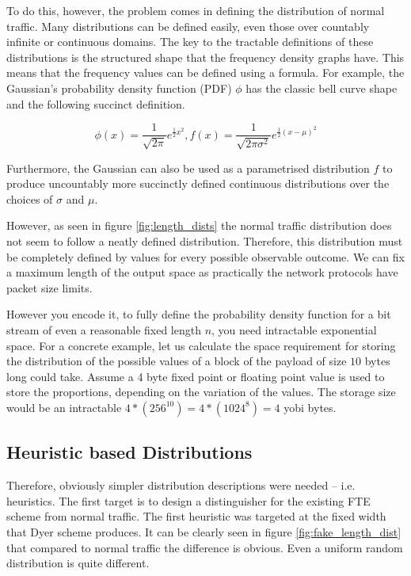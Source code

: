 \documentclass[ %
                    author={Samuel Russell},
                supervisor={Prof. Bogdan Warinschi},
                    degree={MEng},
                     title={Innocuous Ciphertexts},
                  subtitle={The DE-CENSOR Scheme},
                      type={research},
                      year={2018} ]{dissertation}
\begin{document}
To do this, however, the problem comes in defining the distribution of normal traffic.
Many distributions can be defined easily, even those over countably infinite or continuous domains.
The key to the tractable definitions of these distributions is the structured shape that the frequency density graphs have.
This means that the frequency values can be defined using a formula.
For example, the Gaussian's probability density function (PDF) $\phi$ has the classic bell curve shape and the following succinct definition.

$$\phi (x) = \frac{1}{\sqrt{2\pi}}e^{\frac{1}{2}x^2}, f(x) = \frac{1}{\sqrt{2\pi\sigma^2}}e^{\frac{1}{2}(x-\mu)^2}$$

Furthermore, the Gaussian can also be used as a parametrised distribution $f$ to produce uncountably more succinctly defined continuous distributions over the choices of $\sigma$ and $\mu$.

However, as seen in figure \ref{fig:length_dists} the normal traffic distribution does not seem to follow a neatly defined distribution.
Therefore, this distribution must be completely defined by values for every possible observable outcome.
We can fix a maximum length of the output space as practically the network protocols have packet size limits.

However you encode it, to fully define the probability density function for a bit stream of even a reasonable fixed length $n$, you need intractable exponential space.
For a concrete example, let us calculate the space requirement for storing the distribution of the possible values of a block of the payload of size $10$ bytes long could take.
Assume a 4 byte fixed point or floating point value is used to store the proportions, depending on the variation of the values.
The storage size would be an intractable $4*(256^10) = 4*(1024^8) = 4$ yobi bytes.

\subsection{Heuristic based Distributions}

Therefore, obviously simpler distribution descriptions were needed -- i.e. heuristics.
The first target is to design a distinguisher for the existing FTE scheme from normal traffic.
The first heuristic was targeted at the fixed width that Dyer scheme produces.
It can be clearly seen in figure \ref{fig:fake_length_dist} that compared to normal traffic the difference is obvious.
Even a uniform random distribution is quite different.
\end{document}
